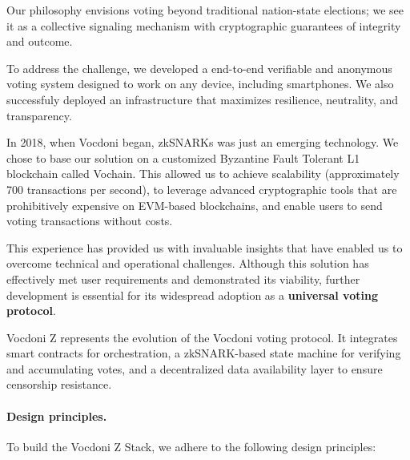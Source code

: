 Our philosophy envisions voting beyond traditional nation-state elections; we see it as a collective signaling mechanism with cryptographic guarantees of integrity and outcome.

To address the challenge, we developed a end-to-end verifiable and anonymous voting system designed to work on any device, including smartphones. We also successfuly deployed an infrastructure that maximizes resilience, neutrality, and transparency.

In 2018, when Vocdoni began, zkSNARKs was just an emerging technology. We chose to base our solution on a customized Byzantine Fault Tolerant L1 blockchain called Vochain. This allowed us to achieve scalability (approximately 700 transactions per second), to leverage advanced cryptographic tools that are prohibitively expensive on EVM-based blockchains, and enable users to send voting transactions without costs.

This experience has provided us with invaluable insights that have enabled us to overcome technical and operational challenges. Although this solution has effectively met user requirements and demonstrated its viability, further development is essential for its widespread adoption as a \textbf{universal voting protocol}.

Vocdoni Z represents the evolution of the Vocdoni voting protocol. It integrates smart contracts for orchestration, a zkSNARK-based state machine for verifying and accumulating votes, and a decentralized data availability layer to ensure censorship resistance.

\paragraph{Design principles.}

To build the Vocdoni Z Stack, we adhere to the following design principles:

